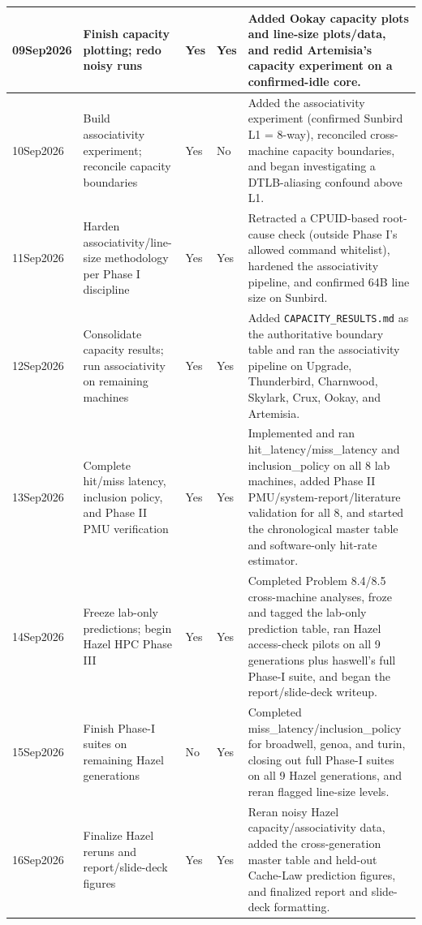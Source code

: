 \documentclass{article}
\begin{document}
\begin{longtable}{|p{2.5cm}|p{3cm}|p{2cm}|p{2cm}|p{5cm}|}
09Sep2026 &
Finish capacity plotting; redo noisy runs &
Yes &
Yes &
Added Ookay capacity plots and line-size plots/data, and redid Artemisia's capacity experiment on a confirmed-idle core. \\
\hline

10Sep2026 &
Build associativity experiment; reconcile capacity boundaries &
Yes &
No &
Added the associativity experiment (confirmed Sunbird L1 = 8-way), reconciled cross-machine capacity boundaries, and began investigating a DTLB-aliasing confound above L1. \\
\hline

11Sep2026 &
Harden associativity/line-size methodology per Phase I discipline &
Yes &
Yes &
Retracted a CPUID-based root-cause check (outside Phase I's allowed command whitelist), hardened the associativity pipeline, and confirmed 64B line size on Sunbird. \\
\hline

12Sep2026 &
Consolidate capacity results; run associativity on remaining machines &
Yes &
Yes &
Added \texttt{CAPACITY\_RESULTS.md} as the authoritative boundary table and ran the associativity pipeline on Upgrade, Thunderbird, Charnwood, Skylark, Crux, Ookay, and Artemisia. \\
\hline

13Sep2026 &
Complete hit/miss latency, inclusion policy, and Phase II PMU verification &
Yes &
Yes &
Implemented and ran hit\_latency/miss\_latency and inclusion\_policy on all 8 lab machines, added Phase II PMU/system-report/literature validation for all 8, and started the chronological master table and software-only hit-rate estimator. \\
\hline

14Sep2026 &
Freeze lab-only predictions; begin Hazel HPC Phase III &
Yes &
Yes &
Completed Problem 8.4/8.5 cross-machine analyses, froze and tagged the lab-only prediction table, ran Hazel access-check pilots on all 9 generations plus haswell's full Phase-I suite, and began the report/slide-deck writeup. \\
\hline

15Sep2026 &
Finish Phase-I suites on remaining Hazel generations &
No &
Yes &
Completed miss\_latency/inclusion\_policy for broadwell, genoa, and turin, closing out full Phase-I suites on all 9 Hazel generations, and reran flagged line-size levels. \\
\hline

16Sep2026 &
Finalize Hazel reruns and report/slide-deck figures &
Yes &
Yes &
Reran noisy Hazel capacity/associativity data, added the cross-generation master table and held-out Cache-Law prediction figures, and finalized report and slide-deck formatting. \\
\hline

\end{longtable}
\end{document}
